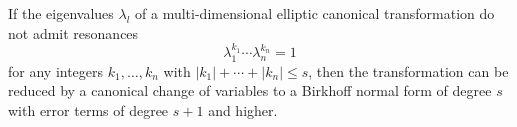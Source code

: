 If the eigenvalues $\lambda_l$ of a multi-dimensional elliptic canonical transformation do not admit resonances
$$\lambda_1^{k_1} \cdots \lambda_n^{k_n} = 1$$
for any integers $k_1,\ldots,k_n$ with $|k_1| + \cdots + |k_n| \leq s$, then the transformation can be reduced by a canonical change of variables to a Birkhoff normal form of degree $s$ with error terms of degree $s+1$ and higher.
